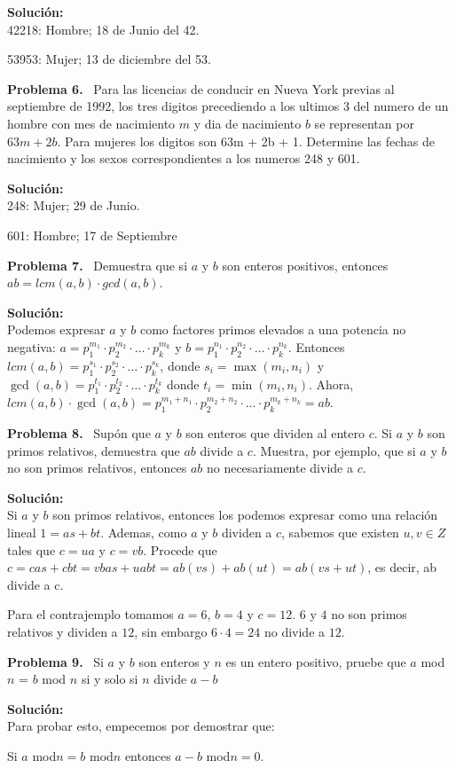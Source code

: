 \documentclass{article}
\newcounter{problem}
\newcounter{solution}
\newcommand\Problem[1]{%
  \stepcounter{problem}%
  \textbf{Problema #1.}~%
  \setcounter{solution}{0}%
}
\newcommand\TheSolution{%
  \textbf{Solución:}\\%
}
\begin{document}
\TheSolution{}
42218: Hombre; 18 de Junio del 42.

53953: Mujer; 13 de diciembre del 53.

\Problem{6} Para las licencias de conducir en Nueva York previas al septiembre
de 1992, los tres digitos precediendo a los ultimos 3 del numero de un hombre
con mes de nacimiento $m$ y dia de nacimiento $b$ se representan por $63m + 2b$.
Para mujeres los digitos son 63m + 2b + 1. Determine las fechas de nacimiento y
los sexos correspondientes a los numeros 248 y 601.

\TheSolution{}
248: Mujer; 29 de Junio.

601: Hombre; 17 de Septiembre

\Problem{7} Demuestra que si $a$ y $b$ son enteros positivos, entonces $ab =
lcm(a, b)\cdot gcd(a, b)$.

\TheSolution{} Podemos expresar $a$ y $b$ como factores primos elevados a una
potencia no negativa: $a = p_1^{m_1}\cdot p_2^{m_2}\cdot \ldots\cdot p_k^{m_k}$
y $b = p_1^{n_1}\cdot p_2^{n_2}\cdot \ldots\cdot p_k^{n_k}$. Entonces $lcm(a, b) =
p_1^{s_1}\cdot p_2^{s_2}\cdot \ldots\cdot p_k^{s_k}$, donde $s_i = \max(m_i,
n_i)$ y $\gcd(a, b) = p_1^{t_1}\cdot p_2^{t_2}\cdot \ldots\cdot p_k^{t_k}$ donde
$t_i = \min(m_i, n_i)$. Ahora, $lcm(a, b) \cdot \gcd(a, b) = p_1^{m_1 +
n_1}\cdot p_2^{m_2 + n_2}\cdot \ldots\cdot p_k^{m_k + n_k} = ab$.

\Problem{8} Supón que $a$ y $b$ son enteros que dividen al entero $c$. Si $a$ y
$b$ son primos relativos, demuestra que $ab$ divide a $c$. Muestra, por ejemplo,
que si $a$ y $b$ no son primos relativos, entonces $ab$ no necesariamente divide
a $c$.

\TheSolution{} Si $a$ y $b$ son primos relativos, entonces los podemos expresar
como una relación lineal $1 = as + bt$. Ademas, como $a$ y $b$ dividen a $c$,
sabemos que existen $u, v \in Z$ tales que $c = ua$ y $c = vb$. Procede que $c =
cas + cbt = vbas + uabt = ab(vs) + ab(ut) = ab(vs + ut)$, es decir, ab divide a
c.

Para el contrajemplo tomamos $a = 6$, $b = 4$ y $c = 12$. $6$ y $4$ no son
primos relativos y dividen a $12$, sin embargo $6 \cdot 4 = 24$ no divide a
$12$.

\Problem{9} Si $a$ y $b$ son enteros y $n$ es un entero positivo, pruebe que
$a$ mod $n$ = $b$ mod $n$ si y solo si $n$ divide $a-b$

\TheSolution{}
Para probar esto, empecemos por demostrar que:

Si $a$ mod$n=b$ mod$n$ entonces $a-b$ mod$n=0$.
\end{document}
